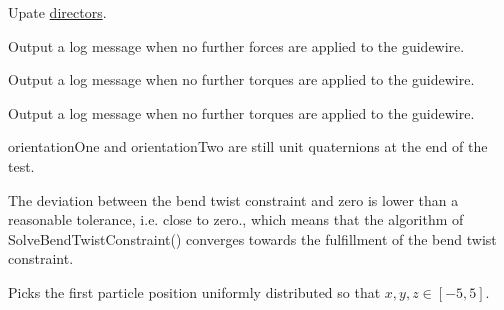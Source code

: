 \begin{DoxyRefList}
Upate \mbox{\hyperlink{class_guidewire_sim_1_1_simulation_loop_a6830906169fc8904910e83ddcf5357e6}{directors}}.  
\item[Member \mbox{\hyperlink{class_guidewire_sim_1_1_stress_test_performer_a73c906296f567e0046463c2b07b5d208}{Guidewire\+Sim.Stress\+Test\+Performer.Perform\+Stress\+Test\+One}} (float apply\+Force\+Time=1f)]\label{requirement__requirement000024}%
%
 Output a log message when no further forces are applied to the guidewire.  
\item[Member \mbox{\hyperlink{class_guidewire_sim_1_1_torque_test_performer_a204d388f34f12b2e9e85502f691dd533}{Guidewire\+Sim.Torque\+Test\+Performer.Perform\+Torque\+Test\+Three}} (Vector3 pull\+Torque, float apply\+Torque\+Time=10f)]\label{requirement__requirement000026}%
%
 Output a log message when no further torques are applied to the guidewire.  
\item[Member \mbox{\hyperlink{class_guidewire_sim_1_1_torque_test_performer_abc8df1bad78eed932a6efabd8ad1f933}{Guidewire\+Sim.Torque\+Test\+Performer.Perform\+Torque\+Test\+Two}} (Vector3 pull\+Torque, float apply\+Torque\+Time=1f)]\label{requirement__requirement000025}%
%
 Output a log message when no further torques are applied to the guidewire.  
\item[Member \mbox{\hyperlink{class_unit_test___solve_bend_twist_constraint_ac8adb520714e1b30a58d9a9fbfd7ada5}{Unit\+Test\+\_\+\+Solve\+Bend\+Twist\+Constraint.Test\+\_\+\+Solve\+Bend\+Twist\+Constraint}} (int iterations, BSM.\+Quaternion orientation\+One, BSM.\+Quaternion orientation\+Two, float rod\+Element\+Length, Vector3 discrete\+Rest\+Darboux\+Vector, \mbox{\hyperlink{class_guidewire_sim_1_1_math_helper}{Guidewire\+Sim.\+Math\+Helper}} math\+Helper, \mbox{\hyperlink{class_guidewire_sim_1_1_constraint_solving_step}{Guidewire\+Sim.\+Constraint\+Solving\+Step}} constraint\+Solving\+Step)]\label{requirement__requirement000027}%
%
 {\ttfamily orientation\+One} and orientation\+Two are still unit quaternions at the end of the test. 



The deviation between the bend twist constraint and zero is lower than a reasonable tolerance, i.\+e. close to zero., which means that the algorithm of Solve\+Bend\+Twist\+Constraint() converges towards the fulfillment of the bend twist constraint.  
\item[Member \mbox{\hyperlink{class_unit_test___solve_stretch_constraint_a1e5987d9972d38ee5a70134b0cb2a83a}{Unit\+Test\+\_\+\+Solve\+Stretch\+Constraint.Pick\+Random\+Positions}} (out Vector3 particle\+Position\+One, out Vector3 particle\+Position\+Two)]\label{requirement__requirement000028}%
%
 Picks the first particle position uniformly distributed so that $ x,y,z \in [-5, 5] $. 




\end{DoxyRefList}
